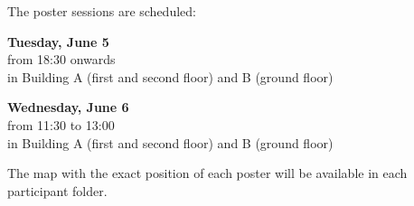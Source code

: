 \begin{center}
  The poster sessions are scheduled:

  \smallskip

  \textbf{Tuesday, June 5} \\
  from 18:30 onwards \\
  in Building A (first and second floor) and B (ground floor)

  \smallskip

  \textbf{Wednesday, June 6}\\
  from 11:30 to 13:00\\
  in Building A (first and second floor) and B (ground floor)

\smallskip
The map with the exact position of each poster will be available in each participant folder.

\end{center}

\bigskip


